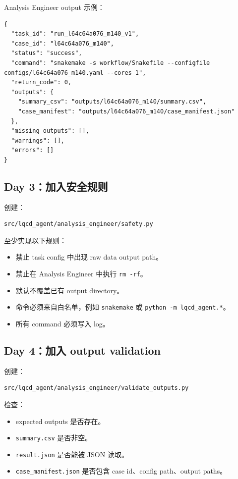 \documentclass[11pt,a4paper,fontset=none]{ctexart}
\begin{document}
Analysis Engineer output 示例：

\begin{lstlisting}
{
  "task_id": "run_l64c64a076_m140_v1",
  "case_id": "l64c64a076_m140",
  "status": "success",
  "command": "snakemake -s workflow/Snakefile --configfile configs/l64c64a076_m140.yaml --cores 1",
  "return_code": 0,
  "outputs": {
    "summary_csv": "outputs/l64c64a076_m140/summary.csv",
    "case_manifest": "outputs/l64c64a076_m140/case_manifest.json"
  },
  "missing_outputs": [],
  "warnings": [],
  "errors": []
}
\end{lstlisting}

\subsection{Day 3：加入安全规则}

创建：

\begin{lstlisting}
src/lqcd_agent/analysis_engineer/safety.py
\end{lstlisting}

至少实现以下规则：

\begin{itemize}[leftmargin=2em]
  \item 禁止 task config 中出现 raw data output path。
  \item 禁止在 Analysis Engineer 中执行 \texttt{rm -rf}。
  \item 默认不覆盖已有 output directory。
  \item 命令必须来自白名单，例如 \texttt{snakemake} 或 \texttt{python -m lqcd\_agent.*}。
  \item 所有 command 必须写入 log。
\end{itemize}

\subsection{Day 4：加入 output validation}

创建：

\begin{lstlisting}
src/lqcd_agent/analysis_engineer/validate_outputs.py
\end{lstlisting}

检查：

\begin{itemize}[leftmargin=2em]
  \item expected outputs 是否存在。
  \item \texttt{summary.csv} 是否非空。
  \item \texttt{result.json} 是否能被 JSON 读取。
  \item \texttt{case\_manifest.json} 是否包含 case id、config path、output paths。
\end{itemize}
\end{document}
